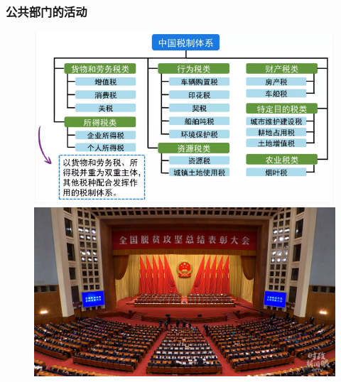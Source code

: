 \documentclass[aspectratio=169, 12pt]{beamer}
\begin{document}
\begin{frame}[plain]
    \frametitle{公共部门的活动}
    \begin{figure}
        \centering
        \begin{minipage}[t]{0.5\linewidth}
            \centering
            \includegraphics[width=1.0\textwidth]{./resources/figure/tax.png}
        \end{minipage}%
        \begin{minipage}[t]{0.5\linewidth}
            \centering
            \includegraphics[width=1.0\textwidth]{./resources/figure/reversepoor.jpg}
        \end{minipage}
    \end{figure}
\end{frame}
\end{document}

